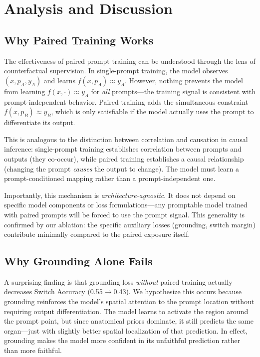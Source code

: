 \section{Analysis and Discussion}

\subsection{Why Paired Training Works}

The effectiveness of paired prompt training can be understood through the lens of counterfactual supervision. In single-prompt training, the model observes $(x, p_A, y_A)$ and learns $f(x, p_A) \approx y_A$. However, nothing prevents the model from learning $f(x, \cdot) \approx y_A$ for \emph{all} prompts---the training signal is consistent with prompt-independent behavior. Paired training adds the simultaneous constraint $f(x, p_B) \approx y_B$, which is only satisfiable if the model actually uses the prompt to differentiate its output.

This is analogous to the distinction between correlation and causation in causal inference: single-prompt training establishes correlation between prompts and outputs (they co-occur), while paired training establishes a causal relationship (changing the prompt \emph{causes} the output to change). The model must learn a prompt-conditioned mapping rather than a prompt-independent one.

Importantly, this mechanism is \emph{architecture-agnostic}. It does not depend on specific model components or loss formulations---any promptable model trained with paired prompts will be forced to use the prompt signal. This generality is confirmed by our ablation: the specific auxiliary losses (grounding, switch margin) contribute minimally compared to the paired exposure itself.

\subsection{Why Grounding Alone Fails}

A surprising finding is that grounding loss \emph{without} paired training actually decreases Switch Accuracy (0.55$\to$0.43). We hypothesize this occurs because grounding reinforces the model's spatial attention to the prompt location without requiring output differentiation. The model learns to activate the region around the prompt point, but since anatomical priors dominate, it still predicts the same organ---just with slightly better spatial localization of that prediction. In effect, grounding makes the model more confident in its unfaithful prediction rather than more faithful.

